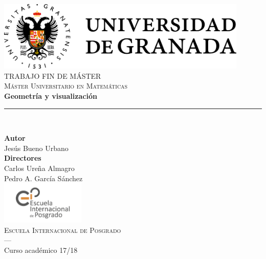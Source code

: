 \begin{titlepage}
 
 
\newlength{\centeroffset}
\setlength{\centeroffset}{-0.5\oddsidemargin}
\addtolength{\centeroffset}{0.5\evensidemargin}
\thispagestyle{empty}

\noindent\hspace*{\centeroffset}\begin{minipage}{\textwidth}

\centering
\includegraphics[width=0.9\textwidth]{images/logo_ugr.png}\\[1.4cm]

\textsc{ \Large TRABAJO FIN DE MÁSTER\\[0.2cm]}
\textsc{Máster Universitario en Matemáticas}\\[1cm]
% 
{\Huge\bfseries Geometría y visualización\\
}
\noindent\rule[-1ex]{\textwidth}{3pt}\\[3.5ex]
\end{minipage}

\vspace{2.5cm}
\noindent\hspace*{\centeroffset}\begin{minipage}{\textwidth}
\centering

\textbf{Autor}\\ {Jesús Bueno Urbano}\\[2.5ex]
\textbf{Directores}\\
{Carlos Ureña Almagro\\
Pedro A. García Sánchez}\\[2cm]
\includegraphics[width=0.3\textwidth]{images/eip-ugr.jpg}\\[0.1cm]
\textsc{Escuela Internacional de Posgrado}\\
\textsc{---}\\
Curso académico 17/18
\end{minipage}
\end{titlepage}


